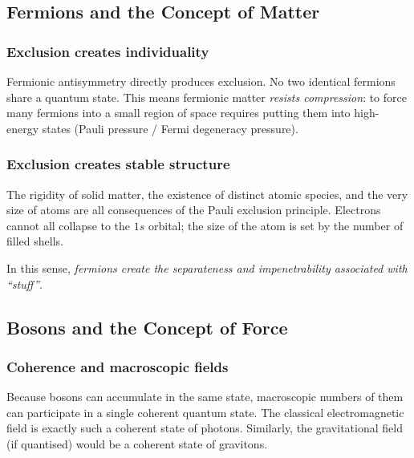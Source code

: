 \documentclass[11pt,a4paper]{article}
\begin{document}
\subsection{Fermions and the Concept of Matter}

\subsubsection{Exclusion creates individuality}

Fermionic antisymmetry directly produces exclusion.  No two identical fermions
share a quantum state.  This means fermionic matter \emph{resists compression}:
to force many fermions into a small region of space requires putting them into
high-energy states (Pauli pressure / Fermi degeneracy pressure).

\subsubsection{Exclusion creates stable structure}

The rigidity of solid matter, the existence of distinct atomic species, and
the very size of atoms are all consequences of the Pauli exclusion principle.
Electrons cannot all collapse to the $1s$ orbital; the size of the atom is
set by the number of filled shells.

In this sense, \emph{fermions create the separateness and impenetrability
associated with ``stuff''}.

\subsection{Bosons and the Concept of Force}

\subsubsection{Coherence and macroscopic fields}

Because bosons can accumulate in the same state, macroscopic numbers of them
can participate in a single coherent quantum state.  The classical
electromagnetic field is exactly such a coherent state of photons.  Similarly,
the gravitational field (if quantised) would be a coherent state of gravitons.
\end{document}

